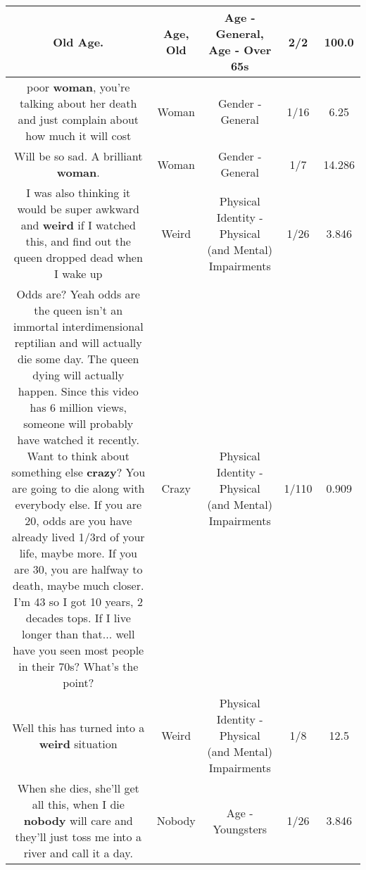 \documentclass[11pt]{article}
\newlength\mylength
\begin{document}
\begin{center}
\begin{longtable}{|C{.65\mylength}|C{.30\mylength}|C{.12\mylength}|C{.12\mylength}|C{.12\mylength}|}
  \small Old \textbf{Age}.\normalsize   & Age, Old & Age - General, Age - Over 65s & 2/2 & 100.0 \\  \hline
  \small poor \textbf{woman}, you're talking about her death and just complain about how much it will cost\normalsize   & Woman & Gender - General & 1/16 & 6.25 \\  \hline
  \small Will be so sad. A brilliant \textbf{woman}.\normalsize   & Woman & Gender - General & 1/7 & 14.286 \\  \hline
  \small I was also thinking it would be super awkward and \textbf{weird} if I watched this, and find out the queen dropped dead when I wake up\normalsize   & Weird & Physical Identity - Physical (and Mental) Impairments & 1/26 & 3.846 \\  \hline
  \small Odds are?  Yeah odds are the queen isn't an immortal interdimensional reptilian and will actually die some day.  The queen dying will actually happen. Since this video has 6 million views, someone will probably have watched it recently.       Want to think about something else \textbf{crazy}?  You are going to die along with everybody else.  If you are 20, odds are you have already lived 1/3rd of your life, maybe more.  If you are 30, you are halfway to death, maybe much closer.  I'm 43 so I got 10 years, 2 decades tops.  If I live longer than that... well have you seen most people in their 70s?  What's the point?\normalsize   & Crazy & Physical Identity - Physical (and Mental) Impairments & 1/110 & 0.909 \\  \hline
  \small Well this has turned into a \textbf{weird} situation\normalsize   & Weird & Physical Identity - Physical (and Mental) Impairments & 1/8 & 12.5 \\  \hline
  \small When she dies, she'll get all this, when I die \textbf{nobody} will care and they'll just toss me into a river and call it a day.\normalsize   & Nobody & Age - Youngsters & 1/26 & 3.846 \\  \hline

\end{longtable}
\end{center}
\end{document}
